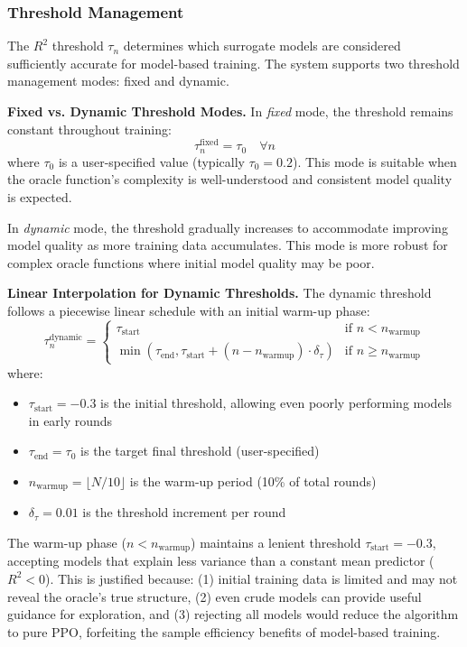 \documentclass[conference]{IEEEtran}
\begin{document}
\subsubsection{Threshold Management}

The $R^2$ threshold $\tau_n$ determines which surrogate models are considered sufficiently accurate for model-based training. The system supports two threshold management modes: fixed and dynamic.

\textbf{Fixed vs. Dynamic Threshold Modes.} In \emph{fixed} mode, the threshold remains constant throughout training:
%
\begin{equation}
\tau_n^{\text{fixed}} = \tau_0 \quad \forall n
\end{equation}
%
where $\tau_0$ is a user-specified value (typically $\tau_0 = 0.2$). This mode is suitable when the oracle function's complexity is well-understood and consistent model quality is expected.

In \emph{dynamic} mode, the threshold gradually increases to accommodate improving model quality as more training data accumulates. This mode is more robust for complex oracle functions where initial model quality may be poor.

\textbf{Linear Interpolation for Dynamic Thresholds.} The dynamic threshold follows a piecewise linear schedule with an initial warm-up phase:
%
\begin{equation}
\tau_n^{\text{dynamic}} = \begin{cases}
\tau_{\text{start}} & \text{if } n < n_{\text{warmup}} \\
\min\left(\tau_{\text{end}}, \tau_{\text{start}} + (n - n_{\text{warmup}}) \cdot \delta_{\tau}\right) & \text{if } n \geq n_{\text{warmup}}
\end{cases}
\end{equation}
%
where:
\begin{itemize}
    \item $\tau_{\text{start}} = -0.3$ is the initial threshold, allowing even poorly performing models in early rounds
    \item $\tau_{\text{end}} = \tau_0$ is the target final threshold (user-specified)
    \item $n_{\text{warmup}} = \lfloor N/10 \rfloor$ is the warm-up period (10\% of total rounds)
    \item $\delta_{\tau} = 0.01$ is the threshold increment per round
\end{itemize}

The warm-up phase ($n < n_{\text{warmup}}$) maintains a lenient threshold $\tau_{\text{start}} = -0.3$, accepting models that explain less variance than a constant mean predictor ($R^2 < 0$). This is justified because: (1) initial training data is limited and may not reveal the oracle's true structure, (2) even crude models can provide useful guidance for exploration, and (3) rejecting all models would reduce the algorithm to pure PPO, forfeiting the sample efficiency benefits of model-based training.
\end{document}
